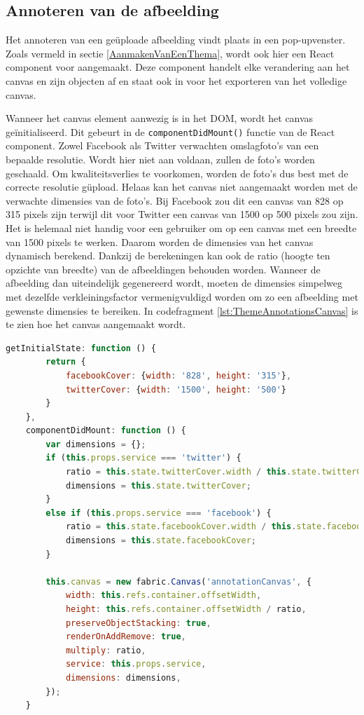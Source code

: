 \subsection{Annoteren van de afbeelding}\label{AnnoterenVanAfbeelding}
Het annoteren van een ge\"{u}ploade afbeelding vindt plaats in een  pop-upvenster. Zoals vermeld in sectie \ref{AanmakenVanEenThema}, wordt ook hier een React component voor aangemaakt. Deze component handelt elke verandering aan het canvas en zijn objecten af en staat ook in voor het exporteren van het volledige canvas. 

Wanneer het canvas element aanwezig is in het DOM, wordt het canvas ge\"{i}nitialiseerd. Dit gebeurt in de \texttt{componentDidMount()} functie van de React component. Zowel Facebook als Twitter verwachten omslagfoto's van een bepaalde resolutie. Wordt hier niet aan voldaan, zullen de foto's worden geschaald. Om kwaliteitsverlies te voorkomen, worden de foto's dus best met de correcte resolutie g\"{u}pload. Helaas kan het canvas niet aangemaakt worden met de verwachte dimensies van de foto's. Bij Facebook zou dit een canvas van 828 op 315 pixels zijn terwijl dit voor Twitter een canvas van 1500 op 500 pixels zou zijn. Het is helemaal niet handig voor een gebruiker om op een canvas met een breedte van 1500 pixels te werken. Daarom worden de dimensies van het canvas dynamisch berekend. Dankzij de berekeningen kan ook de ratio (hoogte ten opzichte van breedte) van de afbeeldingen behouden worden. Wanneer de afbeelding dan uiteindelijk gegenereerd wordt, moeten de dimensies simpelweg met dezelfde verkleiningsfactor vermenigvuldigd worden om zo een afbeelding met gewenste dimensies te bereiken. In codefragment \ref{lst:ThemeAnnotationsCanvas} is te zien hoe het canvas aangemaakt wordt.

\begin{lstlisting}[caption={ThemeAnnotations component - aanmaken canvas}, label={lst:ThemeAnnotationsCanvas},language=javascript]
	getInitialState: function () {
		return {
			facebookCover: {width: '828', height: '315'},
			twitterCover: {width: '1500', height: '500'}
		}
	},
	componentDidMount: function () {
		var dimensions = {};
		if (this.props.service === 'twitter') {
			ratio = this.state.twitterCover.width / this.state.twitterCover.height;
			dimensions = this.state.twitterCover;
		}
		else if (this.props.service === 'facebook') {
			ratio = this.state.facebookCover.width / this.state.facebookCover.height;
			dimensions = this.state.facebookCover;
		}
			
		this.canvas = new fabric.Canvas('annotationCanvas', {
			width: this.refs.container.offsetWidth,
			height: this.refs.container.offsetWidth / ratio,
			preserveObjectStacking: true,
			renderOnAddRemove: true,
			multiply: ratio,
			service: this.props.service,
			dimensions: dimensions,
		});
	}
\end{lstlisting}


